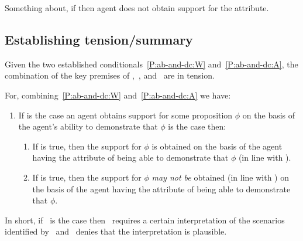 \begin{note}
  Something about, if \eA{} then agent does not obtain support for the attribute.
\end{note}

\subsection{Establishing tension/summary}
\label{sec:establishing-tension}

\begin{note}[Summary]
  Given the two established conditionals~\ref{P:ab-and-dc:W} and~\ref{P:ab-and-dc:A}, the combination of the key premises of \ESU{},~\eA{}, and~\nI{} are in tension.

  For, combining~\ref{P:ab-and-dc:W} and~\ref{P:ab-and-dc:A} we have:
  \begin{enumerate}[label=(CC), ref=(CC)]
  \item If \eA{} is the case an agent obtains support for some proposition \(\phi\) on the basis of the agent's ability to demonstrate that \(\phi\) is the case then:
    \begin{enumerate}[label=(C\arabic*\(\sim\)), ]
    \item If \ESU{} is true, then the support for \(\phi\) is obtained on the basis of the agent having the attribute of being able to demonstrate that \(\phi\) (in line with \AR{}).
    \item If \nI{} is true, then the support for \(\phi\) \emph{may not be} obtained (in line with \AR{}) on the basis of the agent having the attribute of being able to demonstrate that \(\phi\).
    \end{enumerate}
  \end{enumerate}
  In short, if~\eA{} is the case then~\ESU{} requires a certain interpretation of the scenarios identified by~\eA{} and~\nI{} denies that the interpretation is plausible.
\end{note}


